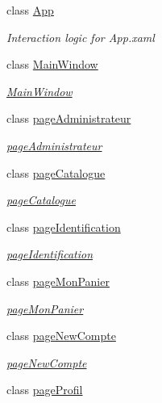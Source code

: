 \begin{DoxyCompactItemize}
\item 
class \hyperlink{classnewPizza1_1_1App}{App}
\begin{DoxyCompactList}\small\item\em Interaction logic for App.\+xaml \end{DoxyCompactList}\item 
class \hyperlink{classnewPizza1_1_1MainWindow}{Main\+Window}
\begin{DoxyCompactList}\small\item\em \hyperlink{classnewPizza1_1_1MainWindow}{Main\+Window} \end{DoxyCompactList}\item 
class \hyperlink{classnewPizza1_1_1pageAdministrateur}{page\+Administrateur}
\begin{DoxyCompactList}\small\item\em \hyperlink{classnewPizza1_1_1pageAdministrateur}{page\+Administrateur} \end{DoxyCompactList}\item 
class \hyperlink{classnewPizza1_1_1pageCatalogue}{page\+Catalogue}
\begin{DoxyCompactList}\small\item\em \hyperlink{classnewPizza1_1_1pageCatalogue}{page\+Catalogue} \end{DoxyCompactList}\item 
class \hyperlink{classnewPizza1_1_1pageIdentification}{page\+Identification}
\begin{DoxyCompactList}\small\item\em \hyperlink{classnewPizza1_1_1pageIdentification}{page\+Identification} \end{DoxyCompactList}\item 
class \hyperlink{classnewPizza1_1_1pageMonPanier}{page\+Mon\+Panier}
\begin{DoxyCompactList}\small\item\em \hyperlink{classnewPizza1_1_1pageMonPanier}{page\+Mon\+Panier} \end{DoxyCompactList}\item 
class \hyperlink{classnewPizza1_1_1pageNewCompte}{page\+New\+Compte}
\begin{DoxyCompactList}\small\item\em \hyperlink{classnewPizza1_1_1pageNewCompte}{page\+New\+Compte} \end{DoxyCompactList}\item 
class \hyperlink{classnewPizza1_1_1pageProfil}{page\+Profil}

\end{DoxyCompactItemize}
